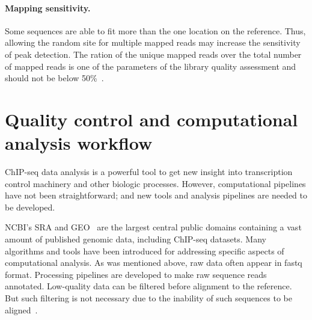 \paragraph{Mapping sensitivity.}
Some sequences are able to fit more than the one location on the reference. Thus, allowing the random site for multiple mapped reads may increase the sensitivity of peak detection. 
The ration of the unique mapped reads over the total number of mapped reads is one of the parameters of the library quality assessment and should not be below 50\%~\cite{shin2013computational}.













\section{Quality control and computational analysis workflow}


ChIP-seq data analysis is a powerful tool to get new insight into transcription control machinery and other biologic processes. 
However, computational pipelines have not been straightforward; 
and new tools and analysis pipelines are needed to be developed.

NCBI's SRA and GEO~\cite{barrett2012ncbi} are the largest central public domains containing a vast amount of published genomic data, including ChIP-seq datasets. 
Many algorithms and tools have been introduced for addressing specific aspects of computational analysis. 
As was mentioned above, raw data often appear in fastq format. 
Processing pipelines are developed to make raw sequence reads annotated.
Low-quality data can be filtered before alignment to the reference. 
But such filtering is not necessary due to the inability of such sequences to be aligned~\cite{furey2012chip}.


